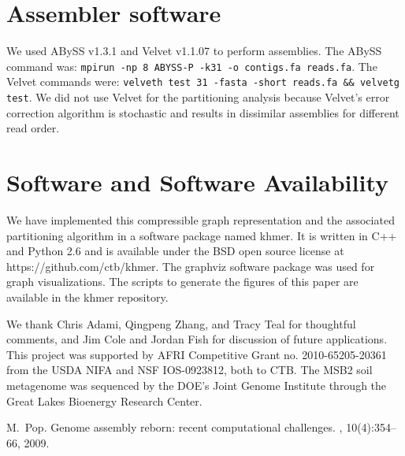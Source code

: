 \documentclass{pnastwo}
\begin{document}
\begin{article}
\begin{materials}
\section{Assembler software}

We used ABySS v1.3.1 and Velvet v1.1.07 to perform assemblies.
The ABySS command was: {\tt mpirun -np 8 ABYSS-P -k31 -o contigs.fa reads.fa}.
The Velvet commands were: {\tt velveth test 31 -fasta -short reads.fa \&\& velvetg test}.
We did not use Velvet for the partitioning analysis because Velvet's
error correction algorithm is stochastic and results in dissimilar
assemblies for different read order.

\section{Software and Software Availability}

We have implemented this compressible graph representation and the associated
partitioning algorithm in a
software package named khmer.  It is written in C++ and Python 2.6 and
is available under the BSD open source license at
https://github.com/ctb/khmer.  The graphviz software package was used
for graph visualizations. The scripts to generate the figures of this
paper are available in the khmer repository.

\end{materials}

\begin{acknowledgments}

We thank Chris Adami, Qingpeng Zhang, and Tracy Teal for
thoughtful comments, and Jim Cole and Jordan Fish for discussion of future
applications.  This project was supported by AFRI Competitive Grant
no. 2010-65205-20361 from the USDA NIFA and NSF IOS-0923812, both to CTB.  The
MSB2 soil metagenome was sequenced by the DOE's Joint Genome
Institute through the Great Lakes Bioenergy Research Center.


\end{acknowledgments}




%

\begin{thebibliography}{10}

M.~Pop.
\newblock Genome assembly reborn: recent computational challenges.
, 10(4):354--66, 2009.


\end{thebibliography}
\end{article}
\end{document}
